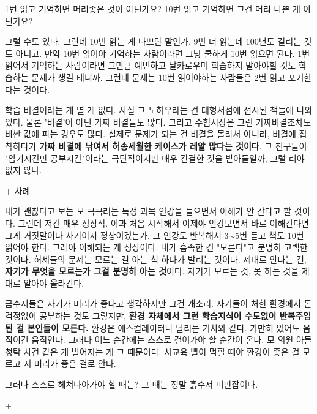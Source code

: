 1번 읽고 기억하면 머리좋은 것이 아닌가요?
10번 읽고 기억하면 그건 머리 나쁜 게 아닌가요?
\vspace{5mm}

그럴 수도 있다. 그런데 10번 읽는 게 나쁘단 말인가.
9번 더 읽는데 100년도 걸리는 것도 아니고.
만약 10번 읽어야 기억하는 사람이라면 그냥 쿨하게 10번 읽으면 된다.
1번 읽어서 기억하는 사람이라면 그만큼 예민하고 날카로우며 학습하지 말아야할 것도 학습하는 문제가 생길 테니까.
그런데 문제는 10번 읽어야하는 사람들은 2번 읽고 포기한다는 것이다.
\vspace{5mm}

학습 비결이라는 게 별 게 없다. 사실 그 노하우라는 건 대형서점에 전시된 책들에 나와있다.
물론 '비결'이 아닌 가짜 비결들도 많다. 그리고 수험시장은 그런 가짜비결조차도 비싼 값에 파는 경우도 많다.
실제로 문제가 되는 건 비결을 몰라서 아니라, 비결에 집착하다가 \textbf{가짜 비결에 낚여서 허송세월한 케이스가 레알 많다는 것이다}.
그 친구들이 "암기시간만 공부시간"이라는 극단적이지만 매우 간결한 것을 받아들일까, 그럴 리야 없지 않나.
\vspace{5mm}

+ 사례
\vspace{5mm}

내가 괜찮다고 보는 모 콕콕러는 특정 과목 인강을 들으면서 이해가 안 간다고 할 것이다.
그런데 저건 매우 정상적. 이과 처음 시작해서 이제야 인강보면서 바로 이해간다면 그게 거짓말이나 사기이지 정상이겠는가.
그 인강도 반복해서 3$\sim$5번 듣고 책도 10번 읽어야 한다. 그래야 이해되는 게 정상이다.
내가 흡족한 건 "모른다"고 분명히 고백한 것이다. 허세들의 문제는 모르는 걸 아는 척 하다가 발리는 것이다.
제대로 안다는 건, \textbf{자기가 무엇을 모르는가 그걸 분명히 아는 것}이다.
자기가 모르는 것, 못 하는 것을 제대로 알아야 올라간다.
\vspace{5mm}

금수저들은 자기가 머리가 좋다고 생각하지만 그건 개소리.
자기들이 처한 환경에서 돈걱정없이 공부하는 것도 그렇지만, \textbf{환경 자체에서 그런 학습지식이 수도없이 반복주입된 걸 본인들이 모른다.}
환경은 에스컬레이터나 달리는 기차와 같다. 가만히 있어도 움직이긴 움직인다.
그러나 어느 순간에는 스스로 걸어가야 할 순간이 온다.
모 의원 아들 청탁 사건 같은 게 벌어지는 게 그 때문이다.
사교육 빨이 먹힐 때야 환경이 좋은 걸 모르고 지 머리가 좋은 걸로 안다.
\vspace{5mm}

그러나 스스로 헤쳐나아가야 할 때는? 그 때는 정말 흙수저 미만잡이다.
\vspace{5mm}

+
\vspace{5mm}

